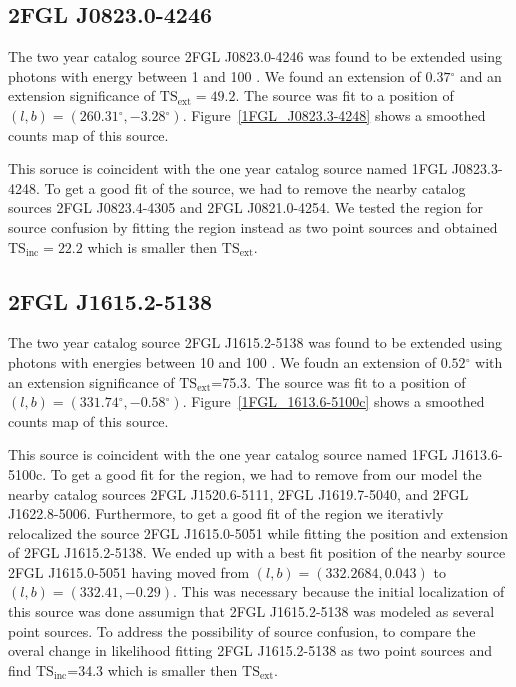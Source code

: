 \documentclass[12pt,preprint]{aastex}
\newcommand{\gev}{\text{GeV}\xspace}
\newcommand{\tsext}{{\ensuremath{\text{TS}_\text{ext}}}\xspace}
\newcommand{\tsinc}{\ensuremath{\text{TS}_\text{inc}}\xspace}
\renewcommand{\deg}{\ensuremath{^\circ}\xspace}
\begin{document}
\subsection{2FGL J0823.0-4246}


The two year catalog source 2FGL J0823.0-4246 was found to be
extended using photons with energy between 1 \gev and 100 \gev.
We found an extension of $0.37\deg$ and an extension
significance of $\tsext=49.2$.  The source was fit to a position of
$(l,b)=(260.31\deg,-3.28\deg)$.  Figure~\ref{1FGL_J0823.3-4248} shows
a smoothed counts map of this source.

This soruce is coincident with the one year catalog source named 1FGL J0823.3-4248.
To get a good fit of the source, we had to remove the nearby catalog
sources 2FGL J0823.4-4305 and 2FGL J0821.0-4254.  We tested the 
region for source confusion by fitting the region instead as two point
sources and obtained $\tsinc=22.2$ which is smaller then \tsext.


\subsection{2FGL J1615.2-5138}


The two year catalog source 2FGL J1615.2-5138 was found to be extended
using photons with energies between 10 \gev and 100 \gev. We foudn an
extension of $0.52\deg$ with an extension significance of \tsext=75.3.
The source was fit to a position of $(l,b)=(331.74\deg,-0.58\deg)$.
Figure~\ref{1FGL_1613.6-5100c} shows a smoothed counts map of this source.

This source is coincident with the one year catalog source named 1FGL
J1613.6-5100c. To get a good fit for the region, we had to remove from our
model the nearby catalog sources 2FGL J1520.6-5111, 2FGL J1619.7-5040,
and 2FGL J1622.8-5006. Furthermore, to get a good fit of the region we
iterativly relocalized the source 2FGL J1615.0-5051 while fitting the
position and extension of 2FGL J1615.2-5138.  We ended up with a best
fit position of the nearby source 2FGL J1615.0-5051 having moved from
$(l,b)=(332.2684,0.043)$ to $(l,b)=(332.41,-0.29)$. This was necessary
because the initial localization of this source was done assumign that
2FGL J1615.2-5138 was modeled as several point sources.  To address
the possibility of source confusion, to compare the overal change in
likelihood fitting 2FGL J1615.2-5138 as two point sources and find
\tsinc=34.3 which is smaller then \tsext.
\end{document}
